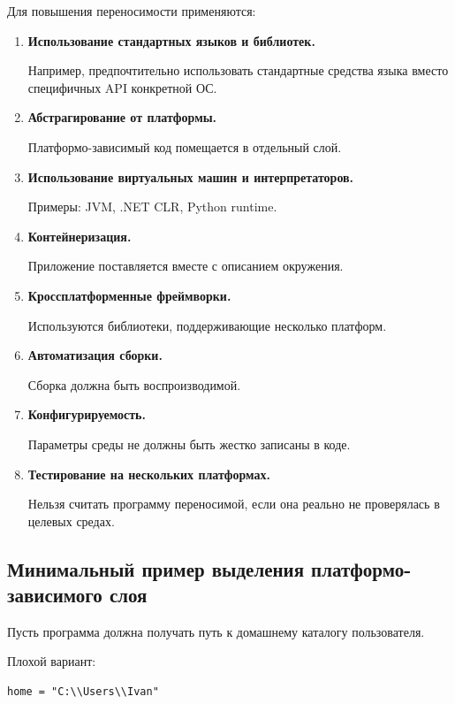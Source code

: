 \documentclass[12pt,a4paper]{article}
\begin{document}
Для повышения переносимости применяются:

\begin{enumerate}
    \item \textbf{Использование стандартных языков и библиотек.}

    Например, предпочтительно использовать стандартные средства языка вместо специфичных API конкретной ОС.

    \item \textbf{Абстрагирование от платформы.}

    Платформо-зависимый код помещается в отдельный слой.

    \item \textbf{Использование виртуальных машин и интерпретаторов.}

    Примеры: JVM, .NET CLR, Python runtime.

    \item \textbf{Контейнеризация.}

    Приложение поставляется вместе с описанием окружения.

    \item \textbf{Кроссплатформенные фреймворки.}

    Используются библиотеки, поддерживающие несколько платформ.

    \item \textbf{Автоматизация сборки.}

    Сборка должна быть воспроизводимой.

    \item \textbf{Конфигурируемость.}

    Параметры среды не должны быть жестко записаны в коде.

    \item \textbf{Тестирование на нескольких платформах.}

    Нельзя считать программу переносимой, если она реально не проверялась в целевых средах.
\end{enumerate}

\subsection{Минимальный пример выделения платформо-зависимого слоя}

Пусть программа должна получать путь к домашнему каталогу пользователя.

Плохой вариант:
\begin{verbatim}
home = "C:\\Users\\Ivan"
\end{verbatim}
\end{document}
